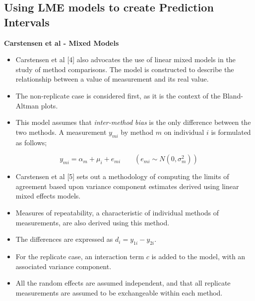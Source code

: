 \subsection{Using LME models to create Prediction Intervals}

%
\textbf{Carstensen et al - Mixed Models}
\begin{itemize}
\item Carstensen et al [4] also advocates the use of linear mixed models in
the study of method comparisons. The model is constructed to
describe the relationship between a value of measurement and its
real value. 

\item The non-replicate case is considered first, as it is
the context of the Bland-Altman plots. 
\item This model assumes that
\textit{inter-method bias} is the only difference between the two methods.
A measurement $y_{mi}$ by method $m$ on individual $i$ is
formulated as follows;
\end{itemize}

\begin{equation}
y_{mi}  = \alpha_{m} + \mu_{i} + e_{mi} \qquad ( e_{mi} \sim
N(0,\sigma^{2}_{m}))
\end{equation}



%
\begin{itemize}
\item Carstensen et al [5] sets out a methodology of computing the limits of
agreement based upon variance component estimates derived using
linear mixed effects models. 
\item Measures of repeatability, a
characteristic of individual methods of measurements, are also
derived using this method.
\end{itemize}


%
\large
\begin{itemize}
\item The differences are expressed as $d_{i} = y_{1i} - y_{2i}$.
\item For the
replicate case, an interaction term $c$ is added to the model,
with an associated variance component. 
\item All the random effects are
assumed independent, and that all replicate measurements are
assumed to be exchangeable within each method.
\end{itemize}


